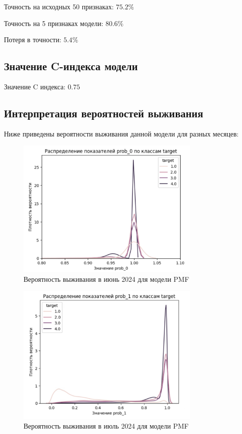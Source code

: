 \documentclass[a4paper,14pt,oneside,openany]{memoir}
\begin{document}
Точность на исходных 50 признаках: $75.2\%$

Точность на 5 признаках модели: $80.6\%$

Потеря в точности: $5.4\%$

\subsection{Значение C-индекса модели}

Значение C индекса: $0.75$

\subsection{Интерпретация вероятностей выживания}

Ниже приведены вероятности выживания данной модели для разных месяцев: 

\begin{figure}[H]
	\includegraphics[width=0.8\textwidth]{../figures/prob_0_pmf.png}
	\caption{Вероятность выживания в июнь 2024 для модели PMF}
\end{figure}

\begin{figure}[H]
	\includegraphics[width=0.8\textwidth]{../figures/prob_1_pmf.png}
	\caption{Вероятность выживания в июль 2024 для модели PMF}
\end{figure}
\end{document}
